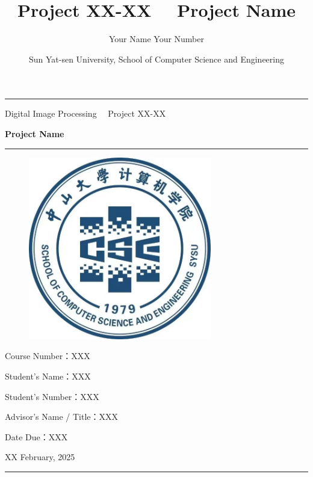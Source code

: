 \documentclass[a4paper, utk8]{ctexart}
\title{\bfseries Project XX-XX \ \ Project Name}
\author{\fangsong Your Name \quad Your Number}
\date{\fangsong Sun Yat-sen University, School of Computer Science and Engineering}
\begin{document}
    \begin{titlepage}
        \centering
        \rule{\textwidth}{1pt}
        \vspace{0.02\textheight}

        {\LARGE Digital Image Processing \ \ Project XX-XX}

        \vspace{0.02\textheight}

        {\Huge \bfseries Project Name}

        \vspace{0.025\textheight}
        \rule{0.83\textwidth}{0.4pt}
        \vspace{0.05\textheight}
        \begin{figure}[htbp]
            \centering
            \includegraphics[width=8cm, height=8cm]{./figure/Department_Sign.jpg}
        \end{figure}

        \vspace{0.05\textheight}
        {\Large Course Number：\textsc{XXX}}

        \vspace{0.025\textheight}
        {\Large Student's Name：\textsc{XXX}}

        \vspace{0.025\textheight}
        {\Large Student's Number：\textsc{XXX}}

        \vspace{0.025\textheight}
        {\Large Advisor's Name / Title：\textsc{XXX}}

        \vspace{0.025\textheight}
        {\Large Date Due：\textsc{XXX}}

        \vspace{0.05\textheight}
        \vfill

        {\large XX February, 2025}
        \vspace{0.1\textheight}
        \rule{\textwidth}{1pt}
    \end{titlepage}
    \let\cleardoublepage\clearpage
\end{document}
